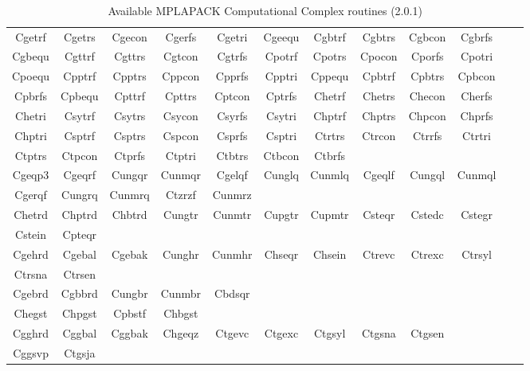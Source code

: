 \documentclass[12pt]{article}
\begin{document}
\begin{table}
\caption{Available MPLAPACK Computational Complex routines (2.0.1)}\label{mplapackcomp_complex}
\begin{center}
{\tt
\begin{tabular}{cccccccccccc} \hline
Cgetrf & Cgetrs & Cgecon & Cgerfs & Cgetri & Cgeequ & Cgbtrf & Cgbtrs & Cgbcon & Cgbrfs \\ %
Cgbequ & Cgttrf & Cgttrs & Cgtcon & Cgtrfs & Cpotrf & Cpotrs & Cpocon & Cporfs & Cpotri \\
Cpoequ & Cpptrf & Cpptrs & Cppcon & Cpprfs & Cpptri & Cppequ & Cpbtrf & Cpbtrs & Cpbcon \\
Cpbrfs & Cpbequ & Cpttrf & Cpttrs & Cptcon & Cptrfs & Chetrf & Chetrs & Checon & Cherfs \\
Chetri & Csytrf & Csytrs & Csycon & Csyrfs & Csytri & Chptrf & Chptrs & Chpcon & Chprfs \\
Chptri & Csptrf & Csptrs & Cspcon & Csprfs & Csptri & Ctrtrs & Ctrcon & Ctrrfs & Ctrtri \\
Ctptrs & Ctpcon & Ctprfs & Ctptri & Ctbtrs & Ctbcon & Ctbrfs \\ \hline
Cgeqp3 & Cgeqrf & Cungqr & Cunmqr & Cgelqf & Cunglq & Cunmlq & Cgeqlf & Cungql & Cunmql \\ %
Cgerqf & Cungrq & Cunmrq & Ctzrzf & Cunmrz \\ \hline
Chetrd & Chptrd & Chbtrd & Cungtr & Cunmtr & Cupgtr & Cupmtr & Csteqr & Cstedc & Cstegr \\ %
Cstein & Cpteqr \\ \hline
Cgehrd & Cgebal & Cgebak & Cunghr & Cunmhr & Chseqr & Chsein & Ctrevc & Ctrexc & Ctrsyl \\ %
Ctrsna & Ctrsen \\ \hline
Cgebrd & Cgbbrd & Cungbr & Cunmbr & Cbdsqr \\ \hline %
Chegst & Chpgst & Cpbstf & Chbgst \\ \hline %
Cgghrd & Cggbal & Cggbak & Chgeqz & Ctgevc & Ctgexc & Ctgsyl & Ctgsna & Ctgsen \\ \hline %
Cggsvp & Ctgsja \\
\hline
\end{tabular}
}
\end{center}
\end{table}
\end{document}
